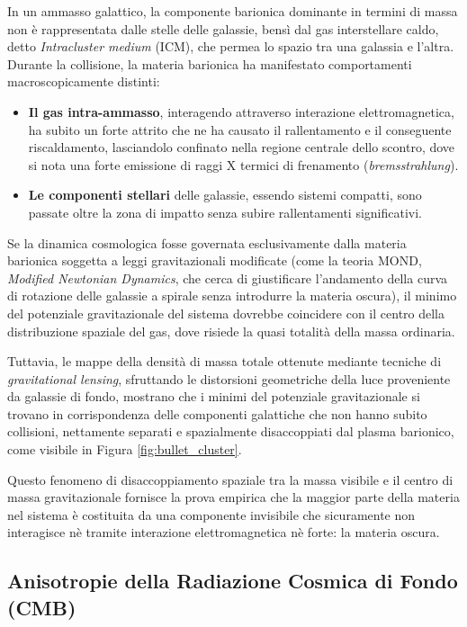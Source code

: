 In un ammasso galattico, la componente barionica dominante in termini di massa non è rappresentata dalle stelle delle galassie, bensì dal gas interstellare caldo, detto \textit{Intracluster medium} (ICM), che permea lo spazio tra una galassia e l'altra. Durante la collisione, la materia barionica ha manifestato comportamenti macroscopicamente distinti:
\begin{itemize}
    \item \textbf{Il gas intra-ammasso}, interagendo attraverso interazione elettromagnetica, ha subito un forte attrito che ne ha causato il rallentamento e il conseguente riscaldamento, lasciandolo confinato nella regione centrale dello scontro, dove si nota una forte emissione di raggi X termici di frenamento (\textit{bremsstrahlung}).
    \item \textbf{Le componenti stellari} delle galassie, essendo sistemi compatti, sono passate oltre la zona di impatto senza subire rallentamenti significativi.
\end{itemize}

Se la dinamica cosmologica fosse governata esclusivamente dalla materia barionica soggetta a leggi gravitazionali modificate (come la teoria MOND, \textit{Modified Newtonian Dynamics}, che cerca di giustificare l'andamento della curva di rotazione delle galassie a spirale senza introdurre la materia oscura), il minimo del potenziale gravitazionale del sistema dovrebbe coincidere con il centro della distribuzione spaziale del gas, dove risiede la quasi totalità della massa ordinaria.

Tuttavia, le mappe della densità di massa totale ottenute mediante tecniche di \textit{gravitational lensing}, sfruttando le distorsioni geometriche della luce proveniente da galassie di fondo, mostrano che i minimi del potenziale gravitazionale si trovano in corrispondenza delle componenti galattiche che non hanno subito collisioni, nettamente separati e spazialmente disaccoppiati dal plasma barionico, come visibile in Figura \ref{fig:bullet_cluster}.

Questo fenomeno di disaccoppiamento spaziale tra la massa visibile e il centro di massa gravitazionale fornisce la prova empirica che la maggior parte della materia nel sistema è costituita da una componente invisibile che sicuramente non interagisce nè tramite interazione elettromagnetica nè forte: la materia oscura.


\subsection{Anisotropie della Radiazione Cosmica di Fondo (CMB)}
\label{subsec:cmb}

